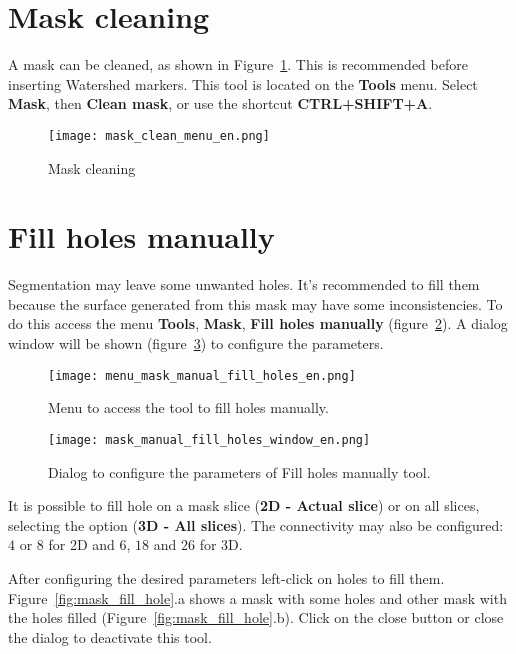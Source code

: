\section{Mask cleaning}
\label{cap:limpeza_mascara}

A mask can be cleaned, as shown in Figure~\ref{fig:limpeza_mascara}. This is recommended before inserting Watershed markers. This tool is located on the \textbf{Tools} menu. Select \textbf{Mask}, then \textbf{Clean mask}, or use the shortcut \textbf{CTRL+SHIFT+A}.

\begin{figure}[!htb]
\centering
\texttt{[image: mask\_clean\_menu\_en.png]}
\caption{Mask cleaning}
\label{fig:limpeza_mascara}
\end{figure}

\section{Fill holes manually}

Segmentation may leave some unwanted holes. It's recommended to fill them because the surface generated from this mask may have some inconsistencies. To do this access the menu \textbf{Tools}, \textbf{Mask}, \textbf{Fill holes manually} (figure~\ref{fig:menu_mask_manual_fill_holes}). A dialog window will be shown (figure~\ref{fig:mask_manual_fill_holes_window}) to configure the parameters.

\begin{figure}[!htb]
\centering
\texttt{[image: menu\_mask\_manual\_fill\_holes\_en.png]}
\caption{Menu to access the tool to fill holes manually.}
\label{fig:menu_mask_manual_fill_holes}
\end{figure}

\begin{figure}[!htb]
\centering
\texttt{[image: mask\_manual\_fill\_holes\_window\_en.png]}
\caption{Dialog to configure the parameters of Fill holes manually tool.}
\label{fig:mask_manual_fill_holes_window}
\end{figure}

It is possible to fill hole on a mask slice (\textbf{2D - Actual slice}) or on all slices, selecting the option (\textbf{3D - All slices}). The connectivity may also be configured: $4$ or $8$ for 2D and $6$, $18$ and $26$ for 3D.

After configuring the desired parameters left-click on holes to fill them. Figure~\ref{fig:mask_fill_hole}.a shows a mask with some holes and other mask with the holes filled (Figure~\ref{fig:mask_fill_hole}.b). Click on the close button or close the dialog to deactivate this tool.


